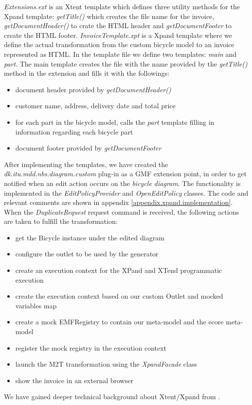 \emph{Extensions.ext} is an Xtent template which defines three utility
methods for the Xpand template: \emph{getTitle()} which creates the file name
for the invoice, \emph{getDocumentHeader()} to crate the HTML header and
\emph{getDocumentFooter} to create the HTML footer. \emph{InvoiceTemplate.xpt}
is a Xpand template where we define the actual transformation from the custom
bicycle model to an invoice represented as HTML. In the template file we define
two templates: \emph{main} and \emph{part}. The main template creates the file
with the name provided by the \emph{getTitle()} method in the extension and
fills it with the followings:
\begin{itemize}
  \item document header provided by \emph{getDocumentHeader()}
  \item customer name, address, delivery date and total price
  \item for each part in the bicycle model, calls the \emph{part} template
  filling in information regarding each bicycle part
  \item document footer provided by \emph{getDocumentFooter}
\end{itemize}

After implementing the templates, we have created the
\emph{dk.itu.mdd.nbs.diagram.custom} plug-in as a GMF extension point, in order
to get notified when an edit action occurs on the \emph{bicycle diagram}. The
functionality is implemented in the \emph{EditPolicyProvider} and
\emph{OpenEditPolicy} classes. The code and relevant comments are shown in
appendix \ref{appendix.xpand.implementation}. When the \emph{DuplicateRequest} request command is received,
the following actions are taken to fulfill the transformation:
\begin{itemize}
  \item get the Bicycle instance under the edited diagram
  \item configure the outlet to be used by the generator
  \item create an execution context for the XPand and XTend programmatic
  execution
  \item create the execution context based on our custom Outlet and
  mocked variables map
  \item create a mock EMFRegistry to contain our meta-model and the
  ecore meta-model
  \item register the mock registry in the execution context
  \item launch the M2T transformation using the \emph{XpandFacade} class
  \item show the invoice in an external browser
\end{itemize}

We have gained deeper technical background about Xtent/Xpand from
\cite{XPAND_EXAMPLE}.
